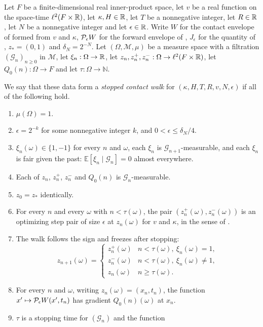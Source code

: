 \begin{definition}
Let $F$ be a finite-dimensional real inner-product space, let $v$ be a real
function on the space-time $\ell^2(F\times\mathbb{R})$, let $\kappa,H\in\mathbb{R}$, let
$T$ be a nonnegative integer, let $R\in\mathbb{R}$, let $N$ be a nonnegative integer
and let $\epsilon\in\mathbb{R}$. Write $W$ for the contact envelope of
 formed from $v$ and $\kappa$,
$\mathcal{P}_\epsilon W$ for the forward envelope of ,
$J_\epsilon$ for the quantity of , $z_*=(0,1)$ and
$\delta_N=2^{-N}$. Let $(\Omega,\mathcal M,\mu)$ be a measure space with a
filtration $(\mathcal G_n)_{n\ge0}$ in $\mathcal M$, let
$\xi_n:\Omega\to\mathbb{R}$, let $z_n,z^+_n,z^-_n:\Omega\to\ell^2(F\times\mathbb{R})$, let
$Q_0(n):\Omega\to F$ and let $\tau:\Omega\to\mathbb N$.

We say that these data form a \emph{stopped contact walk} for
$(\kappa,H,T,R,v,N,\epsilon)$ if all of the following hold.
\begin{enumerate}
\item $\mu(\Omega)=1$.
\item $\epsilon=2^{-k}$ for some nonnegative integer $k$, and
$0<\epsilon\le\delta_N/4$.
\item $\xi_n(\omega)\in\{1,-1\}$ for every $n$ and $\omega$, each $\xi_n$ is
$\mathcal G_{n+1}$-measurable, and each $\xi_n$ is fair given the past:
$\mathbb E[\xi_n\mid\mathcal G_n]=0$ almost everywhere.
\item Each of $z_n$, $z^+_n$, $z^-_n$ and $Q_0(n)$ is
$\mathcal G_n$-measurable.
\item $z_0=z_*$ identically.
\item For every $n$ and every $\omega$ with $n<\tau(\omega)$, the pair
$(z^+_n(\omega),z^-_n(\omega))$ is an optimizing step pair of size $\epsilon$
at $z_n(\omega)$ for $v$ and $\kappa$, in the sense of .
\item The walk follows the sign and freezes after stopping:
\[
  z_{n+1}(\omega)=
  \begin{cases}
    z^+_n(\omega)&n<\tau(\omega),\ \xi_n(\omega)=1,\\
    z^-_n(\omega)&n<\tau(\omega),\ \xi_n(\omega)\ne1,\\
    z_n(\omega)&n\ge\tau(\omega).
  \end{cases}
\]
\item For every $n$ and $\omega$, writing $z_n(\omega)=(x_n,t_n)$, the function
$x'\mapsto\mathcal{P}_\epsilon W(x',t_n)$ has gradient $Q_0(n)(\omega)$ at $x_n$.
\item $\tau$ is a stopping time for $(\mathcal G_n)$ and the function

\end{enumerate}
\end{definition}
